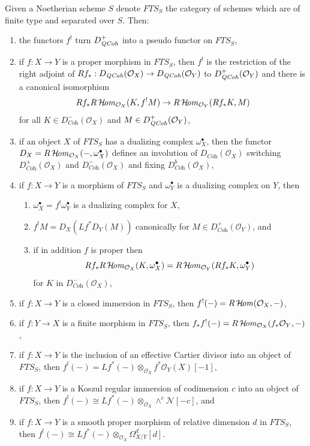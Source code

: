 \medskip\noindent
Given a Noetherian scheme $S$ denote $\textit{FTS}_S$ the category
of schemes which are of finite type and separated over $S$. Then:
\begin{enumerate}
\item the functors $f^!$ turn $D_{\mathit{QCoh}}^+$ into a pseudo functor
on $\textit{FTS}_S$,
\item if $f : X \to Y$ is a proper morphism in $\textit{FTS}_S$,
then $f^!$ is the restriction of the right adjoint of
$Rf_* : D_{\mathit{QCoh}}(\mathcal{O}_X) \to D_{\mathit{QCoh}}(\mathcal{O}_Y)$
to $D_{\mathit{QCoh}}^+(\mathcal{O}_Y)$ and there is a canonical isomorphism
$$
Rf_*R\mathop{\mathcal{H}\!\mathit{om}}\nolimits_{\mathcal{O}_X}(K, f^!M)
\to
R\mathop{\mathcal{H}\!\mathit{om}}\nolimits_{\mathcal{O}_Y}(Rf_*K, M)
$$
for all $K \in D_{\textit{Coh}}^-(\mathcal{O}_X)$ and
$M \in D_{\mathit{QCoh}}^+(\mathcal{O}_Y)$,
\item if an object $X$ of $\textit{FTS}_S$ has a dualizing complex
$\omega_X^\bullet$, then the functor
$D_X = R\mathop{\mathcal{H}\!\mathit{om}}\nolimits_{\mathcal{O}_X}(-, \omega_X^\bullet)$
defines an involution of $D_{\textit{Coh}}(\mathcal{O}_X)$
switching $D_{\textit{Coh}}^+(\mathcal{O}_X)$ and
$D_{\textit{Coh}}^-(\mathcal{O}_X)$ and fixing
$D_{\textit{Coh}}^b(\mathcal{O}_X)$,
\item if $f : X \to Y$ is a morphism of $\textit{FTS}_S$
and $\omega_Y^\bullet$ is a dualizing complex on $Y$, then
\begin{enumerate}
\item $\omega_X^\bullet = f^!\omega_Y^\bullet$ is a dualizing complex for $X$,
\item $f^!M = D_X(Lf^*D_Y(M))$ canonically for
$M \in D_{\textit{Coh}}^+(\mathcal{O}_Y)$, and
\item if in addition $f$ is proper then
$$
Rf_*R\mathop{\mathcal{H}\!\mathit{om}}\nolimits_{\mathcal{O}_X}(K, \omega_X^\bullet) =
R\mathop{\mathcal{H}\!\mathit{om}}\nolimits_{\mathcal{O}_Y}(Rf_*K, \omega_Y^\bullet)
$$
for $K$ in $D^-_{\textit{Coh}}(\mathcal{O}_X)$,
\end{enumerate}
\item if $f : X \to Y$ is a closed immersion in $\textit{FTS}_S$,
then $f^!(-) = R\mathop{\mathcal{H}\!\mathit{om}}\nolimits(\mathcal{O}_X, -)$,
\item if $f : Y \to X$ is a finite morphism in $\textit{FTS}_S$,
then $f_*f^!(-) = R\mathop{\mathcal{H}\!\mathit{om}}\nolimits_{\mathcal{O}_X}(f_*\mathcal{O}_Y, -)$,
\item if $f : X \to Y$ is the inclusion of an effective Cartier divisor
into an object of $\textit{FTS}_S$, then
$f^!(-) = Lf^*(-) \otimes_{\mathcal{O}_X} f^*\mathcal{O}_Y(X)[-1]$,
\item if $f : X \to Y$ is a Koszul regular immersion of codimension $c$
into an object of $\textit{FTS}_S$, then
$f^!(-) \cong Lf^*(-) \otimes_{\mathcal{O}_X} \wedge^c\mathcal{N}[-c]$, and
\item if $f : X \to Y$ is a smooth proper morphism of relative dimension $d$
in $\textit{FTS}_S$, then
$f^!(-) \cong Lf^*(-)  \otimes_{\mathcal{O}_X} \Omega^d_{X/Y}[d]$.
\end{enumerate}
